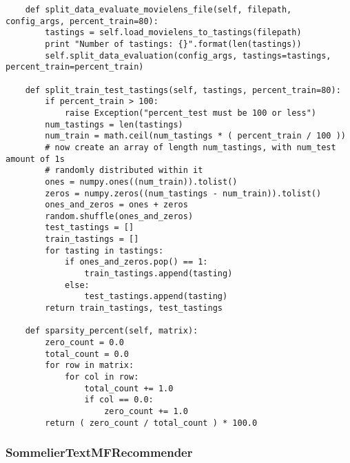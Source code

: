 \begin{verbatim}
    def split_data_evaluate_movielens_file(self, filepath, config_args, percent_train=80):
        tastings = self.load_movielens_to_tastings(filepath)
        print "Number of tastings: {}".format(len(tastings))
        self.split_data_evaluation(config_args, tastings=tastings, percent_train=percent_train)

    def split_train_test_tastings(self, tastings, percent_train=80):
        if percent_train > 100:
            raise Exception("percent_test must be 100 or less")
        num_tastings = len(tastings)
        num_train = math.ceil(num_tastings * ( percent_train / 100 ))
        # now create an array of length num_tastings, with num_test amount of 1s
        # randomly distributed within it
        ones = numpy.ones((num_train)).tolist()
        zeros = numpy.zeros((num_tastings - num_train)).tolist()
        ones_and_zeros = ones + zeros
        random.shuffle(ones_and_zeros)
        test_tastings = []
        train_tastings = []
        for tasting in tastings:
            if ones_and_zeros.pop() == 1:
                train_tastings.append(tasting)
            else:
                test_tastings.append(tasting)
        return train_tastings, test_tastings 

    def sparsity_percent(self, matrix):
        zero_count = 0.0
        total_count = 0.0
        for row in matrix:
            for col in row:
                total_count += 1.0
                if col == 0.0:
                    zero_count += 1.0
        return ( zero_count / total_count ) * 100.0
\end{verbatim}

\subsubsection{SommelierTextMFRecommender}

